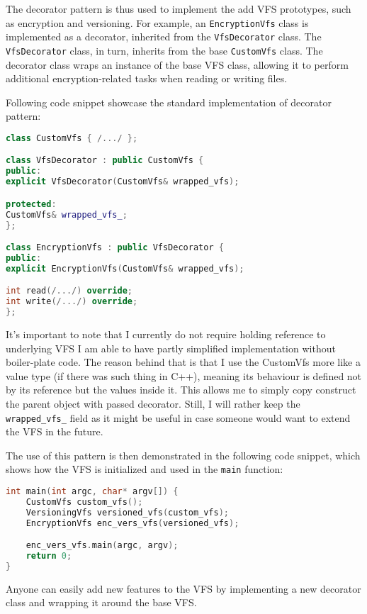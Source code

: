 The decorator pattern is thus used to implement the add VFS prototypes, such as encryption and versioning.
For example, an \texttt{EncryptionVfs} class is implemented as a decorator, inherited from the \texttt{VfsDecorator} class.
The \texttt{VfsDecorator} class, in turn, inherits from the base \texttt{CustomVfs} class.
The decorator class wraps an instance of the base VFS class, allowing it to perform additional encryption-related tasks when reading or writing files.

Following code snippet showcase the standard implementation of decorator pattern:

\begin{lstlisting}[language=c++, basicstyle=\ttfamily\small]
class CustomVfs { /.../ };

class VfsDecorator : public CustomVfs {
public:
explicit VfsDecorator(CustomVfs& wrapped_vfs);

protected:
CustomVfs& wrapped_vfs_;
};

class EncryptionVfs : public VfsDecorator {
public:
explicit EncryptionVfs(CustomVfs& wrapped_vfs);

int read(/.../) override;
int write(/.../) override;
};
\end{lstlisting}

It's important to note that I currently do not require holding reference to underlying VFS I am able to have partly simplified implementation without boiler-plate code.
The reason behind that is that I use the CustomVfs more like a value type (if there was such thing in C++), meaning its behaviour is defined not by its reference but the values inside it.
This allows me to simply copy construct the parent  object with passed decorator.
Still, I will rather keep the \texttt{wrapped\_vfs\_} field as it might be useful in case someone would want to extend the VFS in the future.

The use of this pattern is then demonstrated in the following code snippet, which shows how the VFS is initialized and used in the \texttt{main} function:

\begin{lstlisting}[language=c++, basicstyle=\ttfamily\small]
int main(int argc, char* argv[]) {
    CustomVfs custom_vfs();
    VersioningVfs versioned_vfs(custom_vfs);
    EncryptionVfs enc_vers_vfs(versioned_vfs);

    enc_vers_vfs.main(argc, argv);
    return 0;
}
\end{lstlisting}

Anyone can easily add new features to the VFS by implementing a new decorator class and wrapping it around the base VFS\@.

